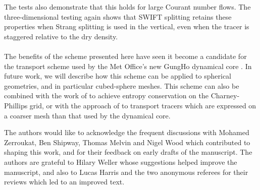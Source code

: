 \documentclass{ametsocV6.1}
\begin{document}
The tests also demonstrate that this holds for large Courant number flows. The three-dimensional testing again shows that SWIFT splitting retains these properties when Strang splitting is used in the vertical, even when the tracer is staggered relative to the dry density. \\
\\
The benefits of the scheme presented here have seen it become a candidate for the transport scheme used by the Met Office's new GungHo dynamical core \citep{melvin2024mixed}.
In future work, we will describe how this scheme can be applied to spherical geometries, and in particular cubed-sphere meshes.
This scheme can also be combined with the work of \citet{thuburn2022numerical} to achieve entropy conservation on the Charney-Phillips grid, or with the approach of \citet{brown2024physics} to transport tracers which are expressed on a coarser mesh than that used by the dynamical core.

\clearpage
\acknowledgments

The authors would like to acknowledge the frequent discussions with Mohamed Zerroukat, Ben Shipway, Thomas Melvin and Nigel Wood which contributed to shaping this work, and for their feedback on early drafts of the manuscript. The authors are grateful to Hilary Weller whose suggestions helped improve the manuscript, and also to Lucas Harris and the two anonymous referees for their reviews which led to an improved text.

% 
%
\datastatement
\end{document}
